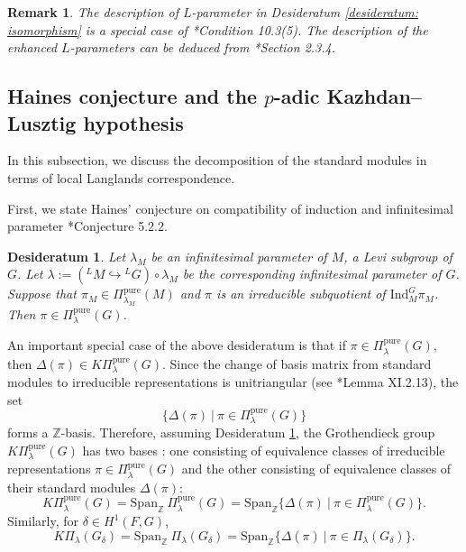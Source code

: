 \documentclass[11pt,letterpaper]{amsart}
\newcommand{\Z}{\mathbb{Z}}
\newcommand{\pure}{\mathrm{pure}}
\newcommand{\Ind}{\mathrm{Ind}}
\newtheorem{remark}[thm]{Remark}
\newtheorem{desideratum}[thm]{Desideratum}
\renewcommand{\1}{\mathbbm{1}}
\numberwithin{equation}{section}
\begin{document}
{\begin{remark}
    The description of $L$-parameter in Desideratum \ref{desideratum: isomorphism} is a special case of \cite{Bor79}*{Condition 10.3(5)}. The description of the enhanced $L$-parameters can be deduced from \cite{Kal23}*{Section 2.3.4}.
\end{remark}

\subsection{\texorpdfstring{Haines conjecture and the $p$-adic Kazhdan--Lusztig hypothesis}{}}\label{subsec: Kazhdan--Lusztig hypothesis}
In this subsection, we discuss the decomposition of the standard modules in terms of local Langlands correspondence.

First, we state Haines' conjecture on compatibility of induction and infinitesimal parameter \cite{Hai14}*{Conjecture 5.2.2}.
\begin{desideratum}\label{desideratum: Haines}
Let $\lambda_M$ be an infinitesimal parameter of $M$, a Levi subgroup of $G$. Let $\lambda:= ({}^L M \hookrightarrow {}^L G) \circ \lambda_M$ be the corresponding infinitesimal parameter of $G$. Suppose that $\pi_M  \in \Pi^{\pure}_{\lambda_M}(M)$ and $\pi$ is an irreducible subquotient of $\Ind_M^G\pi_M$. Then $ \pi \in \Pi^{\pure}_{\lambda}(G)$.
\end{desideratum}




An important special case of the above desideratum is that if $\pi \in \Pi_{\lambda}^{\pure}(G)$, then $\Delta(\pi) \in K\Pi_{\lambda}^{\pure}(G)$. Since the change of basis matrix from standard modules to irreducible representations is unitriangular (see \cite{BW00}*{Lemma XI.2.13}), the set 
\[ \{\Delta(\pi)\ | \ \pi \in \Pi^{\pure}_{\lambda}(G) \}\]
forms a $\Z$-basis. Therefore, assuming Desideratum \ref{desideratum: Haines}, the Grothendieck group $K\Pi_\lambda^\pure(G)$ has two bases {:} one consisting of equivalence classes of irreducible representations $\pi \in \Pi_\lambda^\pure(G)$ and the other consisting of equivalence classes of their standard modules $\Delta(\pi)$:
\begin{equation}\label{equation: gr grp of reps}
    K\Pi_\lambda^\pure(G)=\mathrm{Span}_{\mathbb{Z}}~\Pi_\lambda^\pure(G)=\mathrm{Span}_{\mathbb{Z}}\{\Delta(\pi)\ | \  \pi \in \Pi_\lambda^\pure(G)\}.
\end{equation}
Similarly, for $\delta\in H^1(F,G)$,
\[K\Pi_\lambda(G_\delta)=\mathrm{Span}_{\mathbb{Z}}~\Pi_\lambda(G_\delta)=\mathrm{Span}_{\mathbb{Z}}\{\Delta(\pi)\ | \  \pi \in \Pi_\lambda(G_{\delta})\}.\]


}
\end{document}
